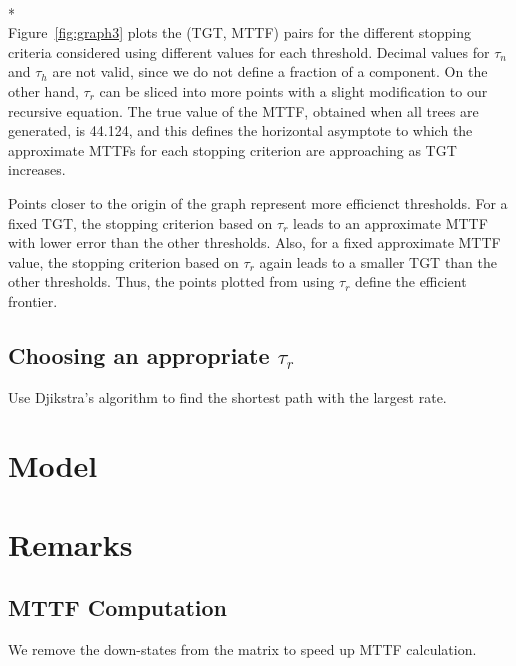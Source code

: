 \documentclass[12pt]{article}
\begin{document}
\begin{minipage}[c]{\textwidth}
	\label{fig:graph3}
\end{minipage}
\\*\\

Figure~\ref{fig:graph3} plots the (TGT, MTTF) pairs for the different stopping
criteria considered using different values for each threshold. Decimal values
for $\tau_n$ and $\tau_h$ are not valid, since we do not define a fraction of
a component. On the other hand, $\tau_r$ can be sliced into more points with a
slight modification to our recursive equation. The true value of the MTTF,
obtained when all trees are generated, is 44.124, and this defines the
horizontal asymptote to which the approximate MTTFs for each stopping
criterion are approaching as TGT increases. 

Points closer to the origin of the graph represent more efficienct thresholds.
For a fixed TGT, the stopping criterion based on $\tau_r$ leads to an
approximate MTTF with lower error than the other thresholds.  Also, for a
fixed approximate MTTF value, the stopping criterion based on $\tau_r$ again
leads to a smaller TGT than the other thresholds.  Thus, the points plotted
from using $\tau_r$ define the efficient frontier.

\subsection{Choosing an appropriate $\tau_r$}
Use Djikstra's algorithm to find the shortest path with the largest rate.

\section{Model}

\section{Remarks}
\subsection{MTTF Computation}
We remove the down-states from the matrix to speed up MTTF calculation. 
\end{document}
